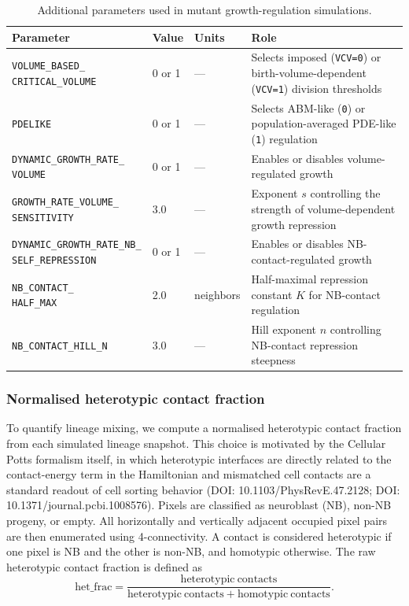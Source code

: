 \begin{table}[!htbp]
\centering
\caption{Additional parameters used in mutant growth-regulation simulations.}
\label{tab:reg-params}
\begin{tabular}{p{5.0cm}p{2.2cm}p{2.0cm}p{5.0cm}}
\toprule
Parameter & Value & Units & Role \\
\midrule
\shortstack[l]{\texttt{VOLUME\_BASED\_}\\\texttt{CRITICAL\_VOLUME}} & 0 or 1 & — & Selects imposed (\texttt{VCV=0}) or birth-volume-dependent (\texttt{VCV=1}) division thresholds \\
\texttt{PDELIKE} & 0 or 1 & — & Selects ABM-like (\texttt{0}) or population-averaged PDE-like (\texttt{1}) regulation \\
\shortstack[l]{\texttt{DYNAMIC\_GROWTH\_RATE\_}\\\texttt{VOLUME}} & 0 or 1 & — & Enables or disables volume-regulated growth \\
\shortstack[l]{\texttt{GROWTH\_RATE\_VOLUME\_}\\\texttt{SENSITIVITY}} & 3.0 & — & Exponent \(s\) controlling the strength of volume-dependent growth repression \\
\shortstack[l]{\texttt{DYNAMIC\_GROWTH\_RATE\_NB\_}\\\texttt{SELF\_REPRESSION}} & 0 or 1 & — & Enables or disables NB-contact-regulated growth \\
\shortstack[l]{\texttt{NB\_CONTACT\_}\\\texttt{HALF\_MAX}} & 2.0 & neighbors & Half-maximal repression constant \(K\) for NB-contact regulation \\
\texttt{NB\_CONTACT\_HILL\_N} & 3.0 & — & Hill exponent \(n\) controlling NB-contact repression steepness \\
\bottomrule
\end{tabular}
\end{table}


\subsubsection{Normalised heterotypic contact fraction}

To quantify lineage mixing, we compute a normalised heterotypic contact fraction from each simulated lineage snapshot.
This choice is motivated by the Cellular Potts formalism itself, in which heterotypic interfaces are directly related to the contact-energy term in the Hamiltonian and mismatched cell contacts are a standard readout of cell sorting behavior (DOI: 10.1103/PhysRevE.47.2128; DOI: 10.1371/journal.pcbi.1008576).
Pixels are classified as neuroblast (NB), non-NB progeny, or empty.
All horizontally and vertically adjacent occupied pixel pairs are then enumerated using 4-connectivity.
A contact is considered heterotypic if one pixel is NB and the other is non-NB, and homotypic otherwise.
The raw heterotypic contact fraction is defined as
\[
\mathrm{het\_frac} = \frac{\mathrm{heterotypic\ contacts}}{\mathrm{heterotypic\ contacts} + \mathrm{homotypic\ contacts}}.
\]

